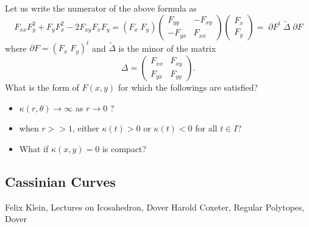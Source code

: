 \documentclass{article}
\begin{document}
\par 
Let us write the numerator of the above formula as
\begin{equation}
\label{}
F_{xx} F_y^2 + F_{y} F_x^2 -  2 F_{xy}F_x F_y 
= (F_x \; F_y) \left(\begin{array}{cc}F_{yy} & -F_{xy} \\-F_{yx} & F_{xx}\end{array}\right) \left(\begin{array}{c}F_{x} \\F_{y}\end{array}\right)
= \;\partial F^t \; \tilde{\Delta} \; \partial F
\end{equation}
where $\partial F = (F_x \; F_y)^t$ and $\tilde{\Delta}$ is the minor of the matrix
\begin{equation}
\label{}
\Delta = \left(\begin{array}{cc}F_{xx} & F_{xy} \\ F_{yx} & F_{yy}\end{array}\right).
\end{equation}
What is the form of $F(x,y)$ for which the followings are satisfied?
\begin{itemize}
  \item $\kappa(r, \theta) \rightarrow \infty$ as $r \rightarrow 0$ ? 
  \item when $r >> 1$, either $\kappa(t) > 0 $ or $\kappa(t) < 0 $ for all $t \in I $?
  \item What if $\kappa(x,y) = 0$ is compact?
\end{itemize}

\subsection{Cassinian Curves}
\label{sec-2-4}

\begin{thebibliography}{10}
        Felix Klein, Lectures on Icosahedron, Dover
        Harold Coxeter, Regular Polytopes, Dover
\end{thebibliography}
\end{document}
